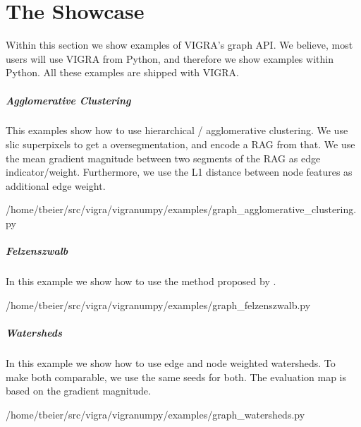 \flushleft
\chapter{The Showcase}\label{ch:the_showcase} 

Within this section we show examples of VIGRA's
graph API. We believe, most users will use
VIGRA from Python, and therefore we show examples
within Python.
All these examples are shipped with  VIGRA.


\paragraph{Agglomerative Clustering}
This examples show how to use  hierarchical /  agglomerative clustering.
We use slic superpixels \citep{achanta_2012_pami}
to get a oversegmentation, and encode a RAG from that.
We use the mean gradient magnitude between two segments 
of the RAG
as edge indicator/weight.
Furthermore, we use the L1 distance between node features
as additional edge weight.




{/home/tbeier/src/vigra/vigranumpy/examples/graph_agglomerative_clustering.py}


%

\paragraph{Felzenszwalb}
In this example we show how to use the method 
proposed by \citet{felzenszwalb_2004_ijcv}.

{/home/tbeier/src/vigra/vigranumpy/examples/graph_felzenszwalb.py}

\paragraph{Watersheds}
In this example we show how to use edge and node weighted
watersheds.
To make both comparable, we use the same seeds for both.
The evaluation map is based on the gradient magnitude.


{/home/tbeier/src/vigra/vigranumpy/examples/graph_watersheds.py}